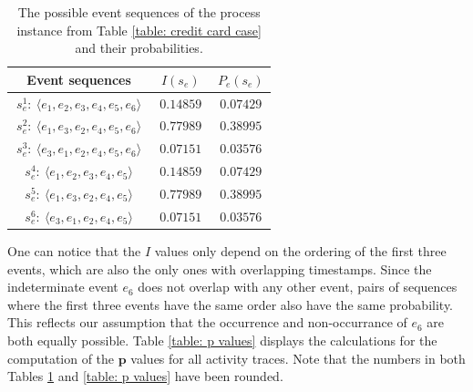 %
%
%
\begin{table}[h]
\caption{The possible event sequences of the process instance from Table \ref{table: credit card case} and their probabilities.}
	\centering
	\begin{tabular}{ccc}
		\textbf{Event sequences} & \textbf{$I(s_e)$} & \textbf{$P_e(s_e)$}
		\\ \hline
	\multicolumn{1}{|c|}{$~ s_e^1:~\langle e_1,e_2,e_3,e_4,e_5,e_6\rangle ~$} & 
	\multicolumn{1}{|c|}{$~ 0.14859 ~$} &
	\multicolumn{1}{|c|}{$~ 0.07429 ~$} 
\\ \hline
	\multicolumn{1}{|c|}{$s_e^2:~\langle e_1,e_3,e_2,e_4,e_5,e_6\rangle$} & 
	\multicolumn{1}{|c|}{$0.77989$} &
	\multicolumn{1}{|c|}{$0.38995$} 
\\ \hline
	\multicolumn{1}{|c|}{$s_e^3:~\langle e_3,e_1,e_2,e_4,e_5,e_6\rangle$} & 
	\multicolumn{1}{|c|}{$0.07151$} &
	\multicolumn{1}{|c|}{$0.03576$} 
\\ \hline
	\multicolumn{1}{|c|}{$s_e^4:~\langle e_1,e_2,e_3,e_4,e_5\rangle$} & 
	\multicolumn{1}{|c|}{$0.14859$} &
	\multicolumn{1}{|c|}{$0.07429$} 
\\ \hline
	\multicolumn{1}{|c|}{$s_e^5:~\langle e_1,e_3,e_2,e_4,e_5\rangle$} & 
	\multicolumn{1}{|c|}{$0.77989$} &
	\multicolumn{1}{|c|}{$0.38995$} 
\\ \hline
	\multicolumn{1}{|c|}{$s_e^6:~\langle e_3,e_1,e_2,e_4,e_5\rangle$} & 
	\multicolumn{1}{|c|}{$0.07151$} &
	\multicolumn{1}{|c|}{$0.03576$} 
\\ \hline
	\end{tabular}
	\label{table: Pe values}
\end{table} 
%
%
%
One can notice that the $I$ values only depend on the ordering of the first three events, which are also the only ones with overlapping timestamps.
Since the indeterminate event $e_6$ does not overlap with any other event, pairs of sequences where the first three events have the same order also have the same probability.
This reflects our assumption that the occurrence and non-occurrance of $e_6$ are both equally possible.
Table \ref{table: p values} displays the calculations for the computation of the $\textbf{p}$ values for all activity traces.
Note that the numbers in both Tables \ref{table: Pe values} and \ref{table: p values} have been rounded.

